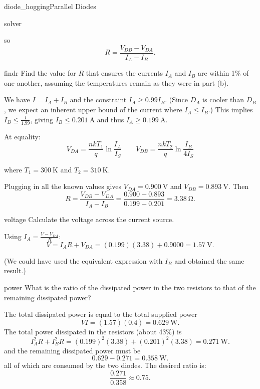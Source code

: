 \begin{mainquestion}{diode_hogging}{Parallel Diodes}
\begin{partquestion}{solver}
\begin{answer}
so
\[
R = \frac{V_{DB} - V_{DA}}{I_A - I_B}.
\]
\end{answer}
\end{partquestion}

\begin{partquestion}{findr}
{Find the value for $R$ that ensures the currents $I_A$ and $I_B$ are within 1\% of one another, assuming the temperatures remain as they were in part (b).}

\begin{answer}
We have $I = I_A + I_B$ and the constraint $I_A \ge 0.99 I_B$. (Since $D_A$ is cooler than $D_B$, we expect an inherent upper bound of the current where $I_A\le I_B$.)  This implies $I_B \le \frac{I}{1.99}$, giving $I_B \le \qty{0.201}{\ampere}$ and thus $I_A \ge \qty{0.199}{\ampere}$.

At equality:
\[
V_{DA} = \frac{nkT_1}{q}\ln\!\frac{I_A}{I_S}
\qquad
V_{DB} = \frac{nkT_2}{q}\ln\!\frac{I_B}{4I_S}
\]

where $T_1 = \qty{300}{\kelvin}$ and $T_2 = \qty{310}{\kelvin}$.

Plugging in all the known values gives $V_{DA} = \qty{0.900}{\volt}$ and $V_{DB} = \qty{0.893}{\volt}$. Then
\[
R = \frac{V_{DB} - V_{DA}}{I_A - I_B}
=
\frac{0.900 - 0.893}{0.199 - 0.201}
=
\qty{3.38}{\ohm}.
\]

\end{answer}
\end{partquestion}

\begin{partquestion}{voltage}
{Calculate the voltage across the current source.}

\begin{answer}
Using $I_A = \frac{V - V_{DA}}{R}$:
\[
V = I_A R + V_{DA}
= (0.199)(3.38) + 0.9000
= \qty{1.57}{\volt}.
\]

(We could have used the equivalent expression with $I_B$ and obtained the same result.)
\end{answer}
\end{partquestion}

\begin{partquestion}{power}
{What is the ratio of the dissipated power in the two resistors to that of the remaining dissipated power?}

\begin{answer}
The total dissipated power is equal to the total supplied power
\[
VI = (1.57)(0.4) = \qty{0.629}{\watt}.
\]
The total power dissipated in the resistors (about 43\%) is
\[
I_A^2 R + I_B^2 R
=
(0.199)^2(3.38) + (0.201)^2(3.38)
=
\qty{0.271}{\watt}.
\]
and the remaining dissipated power must be 
\[
0.629 - 0.271 = \qty{0.358}{\watt}.
\]
all of which are consumed by the two diodes. The desired ratio is:
\[
\frac{0.271}{0.358} \approx 0.75.
\]
\end{answer}
\end{partquestion}

\end{mainquestion}